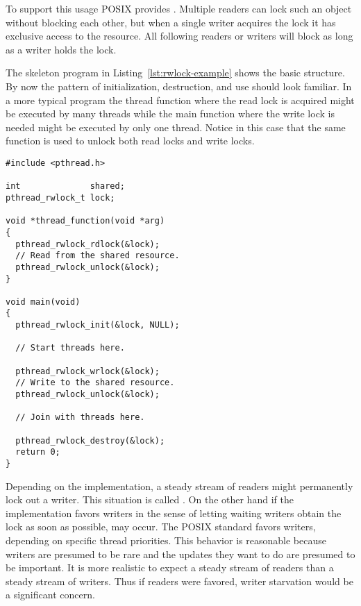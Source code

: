 To support this usage POSIX provides . Multiple readers can lock
such an object without blocking each other, but when a single writer acquires the lock it has
exclusive access to the resource. All following readers or writers will block as long as a
writer holds the lock.

The skeleton program in Listing~\ref{lst:rwlock-example} shows the basic structure. By now the
pattern of initialization, destruction, and use should look familiar. In a more typical program
the thread function where the read lock is acquired might be executed by many threads while the
main function where the write lock is needed might be executed by only one thread. Notice in
this case that the same function is used to unlock both read locks and write locks.

\begin{lstlisting}[float=tp,frame=single,xleftmargin=0in,
  caption={Reader/Writer Lock Example},label=lst:rwlock-example]
#include <pthread.h>

int              shared;
pthread_rwlock_t lock;

void *thread_function(void *arg)
{
  pthread_rwlock_rdlock(&lock);
  // Read from the shared resource.
  pthread_rwlock_unlock(&lock);
}

void main(void)
{
  pthread_rwlock_init(&lock, NULL);
  
  // Start threads here.
  
  pthread_rwlock_wrlock(&lock);
  // Write to the shared resource.
  pthread_rwlock_unlock(&lock);
  
  // Join with threads here.
  
  pthread_rwlock_destroy(&lock);
  return 0;
}
\end{lstlisting}

Depending on the implementation, a steady stream of readers might permanently lock out a writer.
This situation is called . On the other hand if the implementation
favors writers in the sense of letting waiting writers obtain the lock as soon as possible,
 may occur. The POSIX standard favors writers, depending on specific
thread priorities. This behavior is reasonable because writers are presumed to be rare and the
updates they want to do are presumed to be important. It is more realistic to expect a steady
stream of readers than a steady stream of writers. Thus if readers were favored, writer
starvation would be a significant concern.

